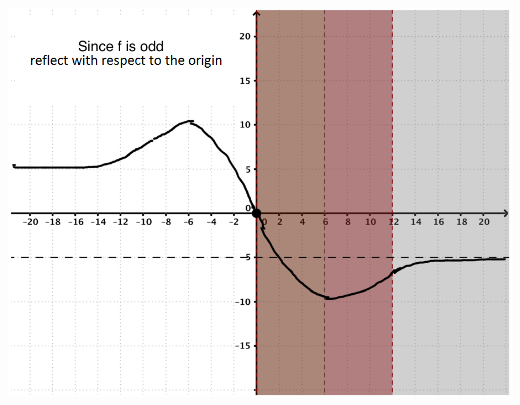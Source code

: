 \documentclass[nooutcomes,handout]{ximera}
\begin{document}
\begin{problem}
\begin{freeResponse}
    \begin{image}
      \includegraphics[scale = 0.35]{Graphfunction7.png}
    \end{image}
  \end{freeResponse}
\end{problem}
\end{document}
